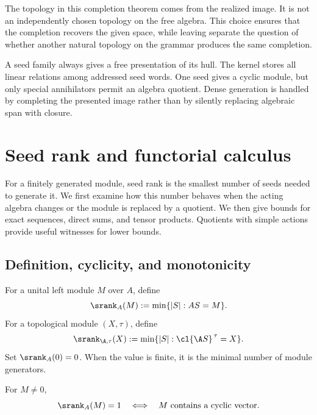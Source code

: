The topology in this completion theorem comes from the realized image.  It is not an independently chosen topology on the free algebra.  This choice ensures that the completion recovers the given space, while leaving separate the question of whether another natural topology on the grammar produces the same completion.

\begin{sectionrecap}
A seed family always gives a free presentation of its hull.  The kernel stores all linear relations among addressed seed words.  One seed gives a cyclic module, but only special annihilators permit an algebra quotient.  Dense generation is handled by completing the presented image rather than by silently replacing algebraic span with closure.
\end{sectionrecap}

\section{Seed rank and functorial calculus}



\begin{readerroadmap}
For a finitely generated module, seed rank is the smallest number of seeds needed to generate it.  We first examine how this number behaves when the acting algebra changes or the module is replaced by a quotient.  We then give bounds for exact sequences, direct sums, and tensor products.  Quotients with simple actions provide useful witnesses for lower bounds.
\end{readerroadmap}
\subsection{Definition, cyclicity, and monotonicity}

\begin{definition}
\label{def:seed-rank}
For a unital left module $M$ over $A$, define
\[
\srank_A(M):=\min\{|S|:AS=M\}.
\]
For a topological module $(X,\tau)$, define
\[
\srank_{\A,\tau}(X):=\min\{|S|:\cl{\A S}^{\,\tau}=X\}.
\]
Set $\srank_A(0)=0$.  When the value is finite, it is the minimal number of module generators.
\end{definition}

\begin{proposition}
\label{prop:cyclic-characterization}
For $M\neq0$,
\[
\srank_A(M)=1
\quad\Longleftrightarrow\quad
M\text{ contains a cyclic vector}.
\]
\end{proposition}

